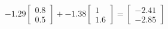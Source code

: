 \documentclass[preview]{standalone}
\begin{document}
\begin{align*}
-1.29 \begin{bmatrix} 0.8 \\ 0.5 \end{bmatrix} + -1.38 \begin{bmatrix} 1 \\ 1.6 \end{bmatrix} = \begin{bmatrix} -2.41 \\ -2.85 \end{bmatrix}
\end{align*}
\end{document}
